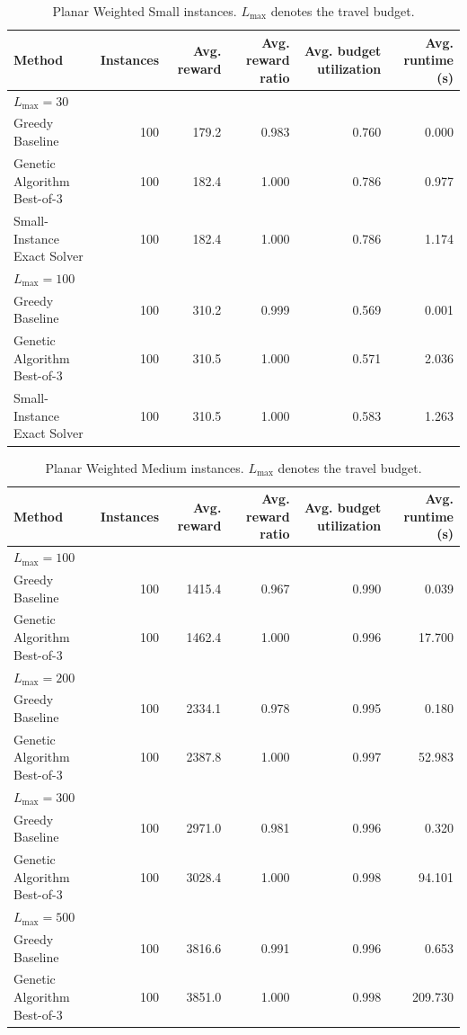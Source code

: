 \begin{table}[ht]
\centering
\caption{Planar Weighted Small instances. $L_{\max}$ denotes the travel budget.}
\begin{tabular}{lrrrrr}
\toprule
Method & Instances & Avg. reward & Avg. reward ratio & Avg. budget utilization & Avg. runtime (s) \\
\midrule
\multicolumn{6}{l}{$L_{\max}=30$} \\
Greedy Baseline & 100 & 179.2 & 0.983 & 0.760 & 0.000 \\
Genetic Algorithm Best-of-3 & 100 & 182.4 & 1.000 & 0.786 & 0.977 \\
Small-Instance Exact Solver & 100 & 182.4 & 1.000 & 0.786 & 1.174 \\
\multicolumn{6}{l}{$L_{\max}=100$} \\
Greedy Baseline & 100 & 310.2 & 0.999 & 0.569 & 0.001 \\
Genetic Algorithm Best-of-3 & 100 & 310.5 & 1.000 & 0.571 & 2.036 \\
Small-Instance Exact Solver & 100 & 310.5 & 1.000 & 0.583 & 1.263 \\
\bottomrule
\end{tabular}
\label{tab:planar-weighted-small-ttsp-results}
\end{table}

\begin{table}[ht]
\centering
\caption{Planar Weighted Medium instances. $L_{\max}$ denotes the travel budget.}
\begin{tabular}{lrrrrr}
\toprule
Method & Instances & Avg. reward & Avg. reward ratio & Avg. budget utilization & Avg. runtime (s) \\
\midrule
\multicolumn{6}{l}{$L_{\max}=100$} \\
Greedy Baseline & 100 & 1415.4 & 0.967 & 0.990 & 0.039 \\
Genetic Algorithm Best-of-3 & 100 & 1462.4 & 1.000 & 0.996 & 17.700 \\
\multicolumn{6}{l}{$L_{\max}=200$} \\
Greedy Baseline & 100 & 2334.1 & 0.978 & 0.995 & 0.180 \\
Genetic Algorithm Best-of-3 & 100 & 2387.8 & 1.000 & 0.997 & 52.983 \\
\multicolumn{6}{l}{$L_{\max}=300$} \\
Greedy Baseline & 100 & 2971.0 & 0.981 & 0.996 & 0.320 \\
Genetic Algorithm Best-of-3 & 100 & 3028.4 & 1.000 & 0.998 & 94.101 \\
\multicolumn{6}{l}{$L_{\max}=500$} \\
Greedy Baseline & 100 & 3816.6 & 0.991 & 0.996 & 0.653 \\
Genetic Algorithm Best-of-3 & 100 & 3851.0 & 1.000 & 0.998 & 209.730 \\
\bottomrule
\end{tabular}
\label{tab:planar-weighted-medium-ttsp-results}
\end{table}

